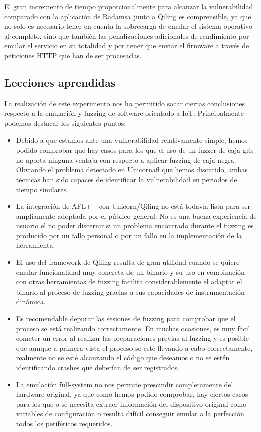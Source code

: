 El gran incremento de tiempo proporcionalmente para alcanzar la vulnerabilidad comparado con la aplicación de Radamsa junto a Qiling es comprensible, ya que 
no solo es necesario tener en cuenta la sobrecarga de emular el sistema operativo al completo, sino que también las penalizaciones adicionales 
de rendimiento por emular el servicio en su totalidad y por tener que enviar el firmware a través de peticiones HTTP que han de ser procesadas.

\subsection{Lecciones aprendidas}
La realización de este experimento nos ha permitido sacar ciertas conclusiones respecto a la emulación y fuzzing de software orientado a IoT.
Principalmente podemos destacar los siguientes puntos:
\begin{itemize}
    \item Debido a que estamos ante una vulnerabilidad relativamente simple, hemos podido comprobar que hay casos para los que el uso de un 
    fuzzer de caja gris no aporta ninguna ventaja con respecto a aplicar fuzzing de caja negra. Obviando el problema detectado en Unicornafl que hemos
    discutido, ambas técnicas han sido capaces de identificar la vulnerabilidad en periodos de tiempo similares.
    \item La integración de AFL++ con Unicorn/Qiling no está todavía lista para ser ampliamente adoptada por el público general. No es una 
    buena experiencia de usuario el no poder discernir si un problema encontrado durante el fuzzing es producido por un fallo personal 
    o por un fallo en la implementación de la herramienta.
    \item El uso del framework de Qiling resulta de gran utilidad cuando se quiere emular funcionalidad muy concreta de un binario y su 
    uso en combinación con otras herramientas de fuzzing facilita considerablemente el adaptar el binario al proceso de fuzzing gracias a 
    sus capacidades de instrumentación dinámica.
    \item Es recomendable depurar las sesiones de fuzzing para comprobar que el proceso se está realizando correctamente. En muchas ocasiones,
    es muy fácil cometer un error al realizar las preparaciones previas al fuzzing y es posible que aunque a primera vista el proceso se esté 
    llevando a cabo correctamente, realmente no se esté alcanzando el código que deseamos o no se estén identificando crashes que deberían de 
    ser registrados.
    \item La emulación full-system no nos permite prescindir completamente del hardware original, ya que como hemos podido comprobar, hay ciertos 
    casos para los que o se necesita extraer información del dispositivo original como variables de configuración o resulta difícil conseguir 
    emular a la perfección todos los periféricos requeridos.
\end{itemize}

